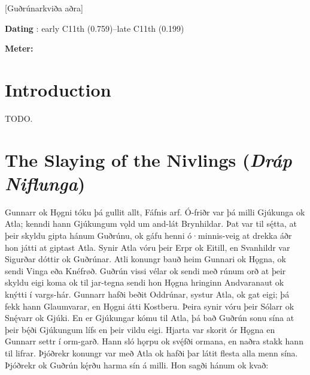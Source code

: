 [Guðrúnarkviða aðra]
\def\thisBookCode{GudrunTwo}

\begin{flushright}%
\textbf{Dating} \parencite{Sapp2022}: early C11th (0.759)–late C11th (0.199)

\textbf{Meter:} \Fornyrdislag%
\end{flushright}

\section{Introduction}

TODO.

\sectionline

\section{The Slaying of the Nivlings (\emph{Dráp Niflunga})}

\bpg\bpa Gunnarr ok Hǫgni tóku þá gullit allt, Fáfnis arf. Ó-friðr var þá milli Gjúkunga ok Atla; kenndi hann Gjúkungum vǫld um and-lát Brynhildar. Þat var til sę́tta, at þeir skyldu gipta hánum Guðrúnu, ok gáfu henni ó·minnis-veig at drekka áðr hon játti at giptast Atla. Synir Atla vóru þeir Erpr ok Eitill, en Svanhildr var Sigurðar dóttir ok Guðrúnar. Atli konungr bauð heim Gunnari ok Hǫgna, ok sendi Vinga eða Knéfrøð. Guðrún vissi vélar ok sendi með rúnum orð at þeir skyldu eigi koma ok til jar-tegna sendi hon Hǫgna hringinn Andvaranaut ok knýtti í vargs-hár. Gunnarr hafði beðit Oddrúnar, systur Atla, ok gat eigi; þá fekk hann Glaumvarar, en Hǫgni átti Kostberu. Þeira synir vóru þeir Sólarr ok Snę́varr ok Gjúki. En er Gjúkungar kómu til Atla, þá bað Guðrún sonu sína at þeir bę́ði Gjúkungum lífs en þeir vildu eigi. Hjarta var skorit ór Hǫgna en Gunnarr settr í orm-garð. Hann sló hǫrpu ok svę́fði ormana, en naðra stakk hann til lifrar. Þjóðrekr konungr var með Atla ok hafði þar látit flesta alla menn sína. Þjóðrekr ok Guðrún kę́rðu harma sín á milli. Hon sagði hánum ok kvað:\epa

